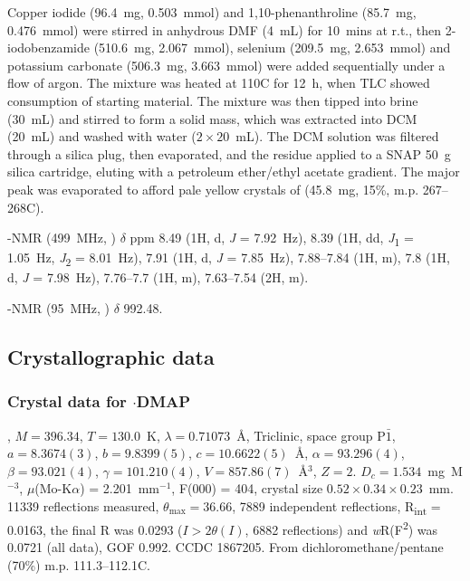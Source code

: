 \begin{refsection}
    Copper iodide (96.4~mg, 0.503~mmol) and 1,10-phenanthroline (85.7~mg, 0.476~mmol) were stirred in anhydrous DMF (4~mL) for 10~mins at r.t., then 2-iodobenzamide (510.6~mg, 2.067~mmol), selenium (209.5~mg, 2.653~mmol) and potassium carbonate (506.3~mg, 3.663~mmol) were added sequentially under a flow of argon.
    The mixture was heated at 110\degree{}C for 12~h, when TLC showed consumption of starting material.
    The mixture was then tipped into brine (30~mL) and stirred to form a solid mass, which was extracted into DCM (20~mL) and washed with water ($ 2 \times 20 $~mL).
    The DCM solution was filtered through a silica plug, then evaporated, and the residue applied to a SNAP 50~g silica cartridge, eluting with a petroleum ether/ethyl acetate gradient.
    The major peak was evaporated to afford pale yellow crystals of  (45.8~mg, 15\%, m.p. 267--268\degree{}C). 
    
    -NMR (499~MHz, ) $\delta$ ppm 8.49 (1H, d, \textit{J} = 7.92~Hz), 8.39 (1H, dd, \textit{J}\textsubscript{1} = 1.05~Hz, \textit{J}\textsubscript{2} = 8.01~Hz), 7.91 (1H, d, \textit{J} = 7.85~Hz), 7.88--7.84 (1H, m), 7.8 (1H, d, \textit{J} = 7.98~Hz), 7.76--7.7 (1H, m), 7.63--7.54 (2H, m).
    
    -NMR (95~MHz, ) $ \delta $ 992.48.
    
    \subsection{Crystallographic data}\label{sec:ch3-si}
    
    \subsubsection{Crystal data for \texorpdfstring{$ \cdot $DMAP}{C20H19N3OSe}}
    , $M=396.34$, $T=130.0$~K, $ \lambda=0.71073 $~\AA, Triclinic, space group P$\bar{1}$, $a = 8.3674(3)$, $b = 9.8399(5)$, $c =10.6622(5)$~\AA, $\alpha=93.296(4)$\degree, $\beta=93.021(4)$\degree, $\gamma=101.210(4)$\degree, $V=857.86(7)$~\AA$^{3}$, $Z = 2$.
    $D_{c}= 1.534$~mg~M$^{-3}$, $\mu$(Mo-K$\alpha$) = 2.201~mm$^{-1}$, F(000) = 404, crystal size $0.52 \times 0.34 \times 0.23$~mm.
    11339 reflections measured, $\theta_{\max}=36.66$\degree, 7889 independent reflections, R\textsubscript{int} = 0.0163, the final R was 0.0293 ($I > 2\theta(I)$, 6882 reflections) and \textit{w}R(F\textsuperscript{2}) was 0.0721 (all data), GOF 0.992.
    CCDC 1867205.
    From dichloromethane/pentane (70\%) m.p. 111.3--112.1\degree{}C.
    

\end{refsection}
